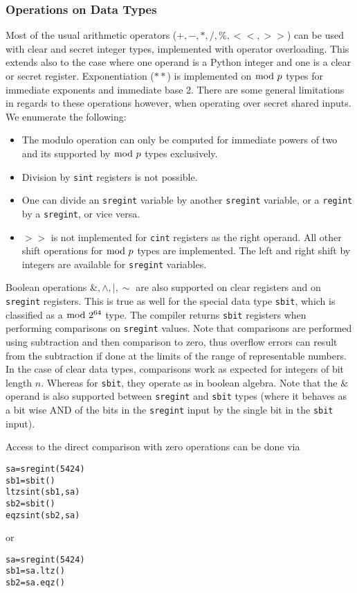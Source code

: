\subsubsection{Operations on Data Types}
Most of the usual arithmetic operators ($+, -, *, /, \%, <<, >>$) can be used with
clear and secret integer types, implemented with operator overloading.
This extends also to the case where one operand is a Python integer and one
is a clear or secret register.
Exponentiation ($**$) is implemented on $\bmod \; p$ types for immediate exponents and
immediate base 2.
There are some general limitations in regards to these operations however, when operating over secret shared inputs. We enumerate the following:
\begin{itemize}
  \item The modulo operation can only be computed for immediate powers
        of two and its supported by $\bmod \; p$ types exclusively.
  \item Division by \verb|sint| registers is not possible.
  \item One can divide an  \verb|sregint| variable by another \verb|sregint| variable,
        or a \verb|regint| by a \verb|sregint|, or vice versa.
  \item $>>$ is not implemented for \verb|cint| registers as the right operand.
        All other shift operations for $\bmod \; p$ types are implemented.
        The left and right shift by integers are available for \verb|sregint| variables.
\end{itemize}
Boolean operations $\&, \wedge, |, \sim$ are also supported on clear registers
and on \verb|sregint| registers.
This is true as well for the special data type \verb|sbit|,
which is classified as a $\bmod \; 2^{64}$ type.
The compiler returns \verb|sbit| registers when performing comparisons on \verb|sregint| values.
Note that comparisons are performed using subtraction and then comparison to zero,
thus overflow errors can result from the subtraction if done at the limits of the range
of representable numbers.
In the case of clear data types, comparisons work as expected for integers of bit length $n$. Whereas for \verb|sbit|, they operate as in boolean algebra. Note that the $\&$ operand is also supported between \verb|sregint| and \verb|sbit| types
(where it behaves as a bit wise AND of the bits in the \verb|sregint| input by the single bit in the
\verb|sbit| input).

Access to the direct comparison with zero operations can be done via
\begin{lstlisting}
sa=sregint(5424)
sb1=sbit()
ltzsint(sb1,sa)
sb2=sbit()
eqzsint(sb2,sa)
\end{lstlisting}
or
\begin{lstlisting}
sa=sregint(5424)
sb1=sa.ltz()
sb2=sa.eqz()
\end{lstlisting}


